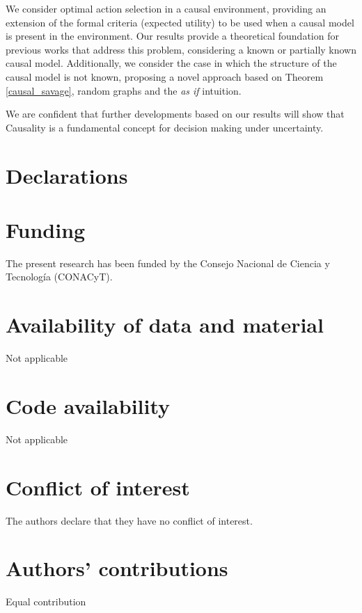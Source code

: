 \documentclass{svjour3}                     %
\begin{document}
We consider optimal action selection in a causal environment, providing an extension of the formal criteria (expected utility) to be used when a causal model is present in the environment. Our results provide a theoretical foundation for previous works that address this problem, considering a known or partially known causal model. Additionally, we consider the case in which the structure of the causal model is not known, proposing a novel approach based on Theorem \ref{causal_savage}, random graphs and the \textit{as if} intuition.

We are confident that further developments based on our results will show that Causality is a fundamental concept for decision making under uncertainty.


\section*{Declarations}

\section*{Funding}
The present research has been funded by the Consejo Nacional de Ciencia y Tecnolog\'ia (CONACyT).

\section*{Availability of data and material}
Not applicable

\section*{Code availability}
Not applicable

\section*{Conflict of interest} 
The authors declare that they have no conflict of interest.

\section*{Authors' contributions}
Equal contribution

%

\end{document}
